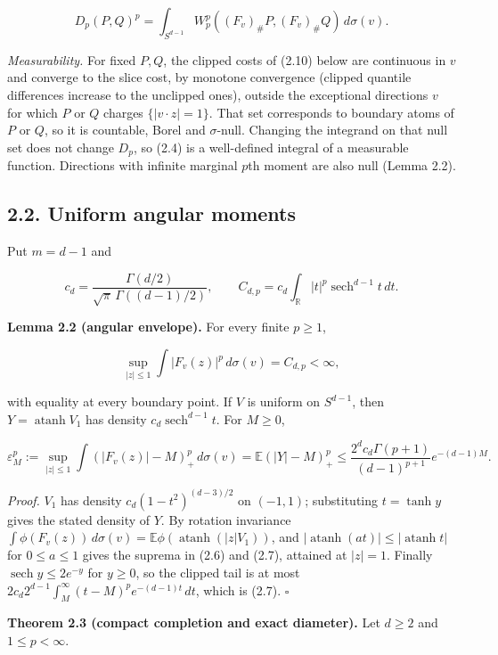 \documentclass[
  british,
  11pt,
  a4paper,
]{article}
\begin{document}
\[
D_p(P,Q)^p=\int_{S^{d-1}}W_p^p((F_v)_\#P,(F_v)_\#Q)\,d\sigma(v).
\tag{2.4}
\]

\emph{Measurability.} For fixed \(P,Q\), the clipped costs of (2.10)
below are continuous in \(v\) and converge to the slice cost, by
monotone convergence (clipped quantile differences increase to the
unclipped ones), outside the exceptional directions \(v\) for which
\(P\) or \(Q\) charges \(\{|v\cdot z|=1\}\). That set corresponds to
boundary atoms of \(P\) or \(Q\), so it is countable, Borel and
\(\sigma\)-null. Changing the integrand on that null set does not change
\(D_p\), so (2.4) is a well-defined integral of a measurable function.
Directions with infinite marginal \(p\)th moment are also null (Lemma
2.2).

\subsection{2.2. Uniform angular moments}\label{uniform-angular-moments}

Put \(m=d-1\) and

\[
c_d=\frac{\Gamma(d/2)}{\sqrt\pi\,\Gamma((d-1)/2)},
\qquad
C_{d,p}=c_d\int_{\mathbb R}|t|^p\operatorname{sech}^{d-1}t\,dt.
\tag{2.5}
\]

\textbf{Lemma 2.2 (angular envelope).} For every finite \(p\geq1\),

\[
\sup_{|z|\leq1}\int|F_v(z)|^p\,d\sigma(v)=C_{d,p}<\infty,
\tag{2.6}
\]

with equality at every boundary point. If \(V\) is uniform on
\(S^{d-1}\), then \(Y=\operatorname{atanh}V_1\) has density
\(c_d\operatorname{sech}^{d-1}t\). For \(M\geq0\),

\[
\varepsilon_M^p:=\sup_{|z|\leq1}\int (|F_v(z)|-M)_+^p\,d\sigma(v)=\mathbb E(|Y|-M)_+^p
\leq \frac{2^d c_d\Gamma(p+1)}{(d-1)^{p+1}}e^{-(d-1)M}.
\tag{2.7}
\]

\emph{Proof.} \(V_1\) has density \(c_d(1-t^2)^{(d-3)/2}\) on
\((-1,1)\); substituting \(t=\tanh y\) gives the stated density of
\(Y\). By rotation invariance
\(\int\phi(F_v(z))\,d\sigma(v)=\mathbb E\phi(\operatorname{atanh}(|z|V_1))\),
and \(|\operatorname{atanh}(at)|\leq|\operatorname{atanh}t|\) for
\(0\leq a\leq1\) gives the suprema in (2.6) and (2.7), attained at
\(|z|=1\). Finally \(\operatorname{sech}y\leq2e^{-y}\) for \(y\geq0\),
so the clipped tail is at most
\(2c_d2^{d-1}\int_M^\infty (t-M)^p e^{-(d-1)t}\,dt\), which is (2.7).
\(\square\)

\textbf{Theorem 2.3 (compact completion and exact diameter).} Let
\(d\geq2\) and \(1\leq p<\infty\).
\end{document}
